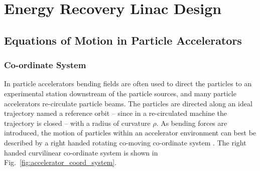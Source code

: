 \documentclass[../main.tex]{subfiles}
\begin{document}
\chapter{Energy Recovery Linac Design}
\label{Energy_Recovery_Linac_Design} %

\section{Equations of Motion in Particle Accelerators}

\subsection{Co-ordinate System}

In particle accelerators bending fields are often used to direct the particles to an experimental station downstream of the particle sources, and many particle accelerators re-circulate particle beams. The particles are directed along an ideal trajectory named a reference orbit -- since in a re-circulated machine the trajectory is closed -- with a radius of curvature $\rho$. As bending forces are introduced, the motion of particles within an accelerator environment can best be described by a right handed rotating co-moving co-ordinate system \cite{wille2000physics}. The right handed curvilinear co-ordinate system is shown in Fig.~\ref{fig:accelerator_coord_system}.   
\end{document}
